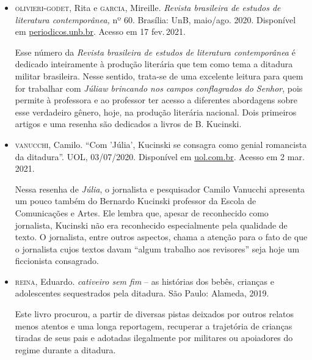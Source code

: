 \documentclass[12pt]{extarticle}
\begin{document}
\begin{itemize}
\item \textsc{olivieri-godet}, Rita e \textsc{garcia}, Mireille. \emph{Revista brasileira de
estudos de literatura contemporânea,} nº 60. Brasília: UnB, maio/ago.
2020. Disponível em
\href{periodicos.unb.br/index.php/estudos/issue/view/1995}{periodicos.unb.br}.
Acesso em 17 fev.\,2021.

Esse número da \emph{Revista brasileira de estudos de literatura
contemporânea} é dedicado inteiramente à produção literária que tem como
tema a ditadura militar brasileira. Nesse sentido, trata-se de uma
excelente leitura para quem for trabalhar com \emph{Júliaw brincando nos
campos conflagrados do Senhor}, pois permite à professora e ao professor
ter acesso a diferentes abordagens sobre esse verdadeiro gênero, hoje,
na produção literária nacional. Dois primeiros artigos e uma resenha são
dedicados a livros de B. Kucinski.

\item \textsc{vanucchi}, Camilo. ``Com 'Júlia', Kucinski se consagra como genial
romancista da ditadura''. UOL, 03/07/2020. Disponível em
\href{https://noticias.uol.com.br/colunas/camilo-vannuchi/2020/07/03/com-julia-kucinski-se-consagra-como-genial-romancista-da-ditadura.htm}{{uol.com.br}}.
Acesso em 2 mar. 2021.

Nessa resenha de \emph{Júlia}, o jornalista e pesquisador Camilo
Vanucchi apresenta um pouco também do Bernardo Kucinski professor da
Escola de Comunicações e Artes. Ele lembra que, apesar de reconhecido
como jornalista, Kucinski não era reconhecido especialmente pela
qualidade de texto. O jornalista, entre outros aspectos, chama a atenção
para o fato de que o jornalista cujos textos davam ``algum trabalho aos
revisores'' seja hoje um ficcionista consagrado.

\item \textsc{reina}, Eduardo. \emph{cativeiro sem fim} -- as histórias dos bebês,
crianças e adolescentes sequestrados pela ditadura. São Paulo: Alameda,
2019.

Este livro procurou, a partir de diversas pistas deixados por outros
relatos menos atentos e uma longa reportagem, recuperar a trajetória de
crianças tiradas de seus pais e adotadas ilegalmente por militares ou
apoiadores do regime durante a ditadura.


\end{itemize}
\end{document}
